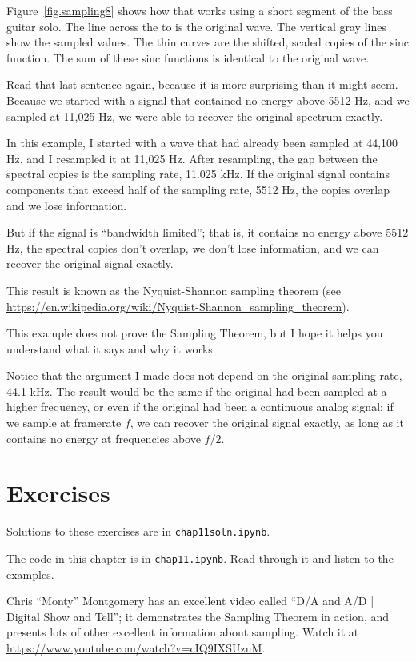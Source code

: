 \documentclass[12pt]{book}
\begin{document}
Figure~\ref{fig.sampling8} shows how that works using a short segment
of the bass guitar solo.  The line across the to is the original
wave.  The vertical gray lines show the sampled values.  The thin
curves are the shifted, scaled copies of the sinc function.
The sum of these sinc functions is identical to the original wave.

Read that last sentence again, because it is more surprising than it
might seem.  Because we started with a signal that contained no energy
above 5512 Hz, and we sampled at 11,025 Hz, we were able to recover
the original spectrum exactly.

In this example, I started with a wave that had already been
sampled at 44,100 Hz, and I resampled it at 11,025 Hz.  After
resampling, the gap between the spectral copies is the sampling
rate, 11.025 kHz.  If the original signal contains components that
exceed half of the sampling rate, 5512 Hz, the copies overlap
and we lose information.

But if the signal is ``bandwidth limited''; that is, it contains no
energy above 5512 Hz, the spectral copies don't overlap, we don't lose
information, and we can recover the original signal exactly.

This result is known as the Nyquist-Shannon sampling theorem (see 
\url{https://en.wikipedia.org/wiki/Nyquist-Shannon_sampling_theorem}).

This example does not prove the Sampling Theorem, but I hope it
helps you understand what it says and why it works.

Notice that the argument I made does
not depend on the original sampling rate, 44.1 kHz.  The result
would be the same if the original had been sampled at a higher
frequency, or even if the original had been a continuous analog
signal: if we sample at framerate $f$, we can recover the original
signal exactly, as long as it contains no energy at frequencies
above $f/2$.  


\section{Exercises}

Solutions to these exercises are in {\tt chap11soln.ipynb}.

\begin{exercise}
The code in this chapter is in {\tt chap11.ipynb}.  Read through
it and listen to the examples.
\end{exercise}


\begin{exercise}
Chris ``Monty'' Montgomery has an excellent video called ``D/A and A/D
| Digital Show and Tell''; it demonstrates the Sampling Theorem in
action, and presents lots of other excellent information about
sampling.  Watch it at
\url{https://www.youtube.com/watch?v=cIQ9IXSUzuM}.
\end{exercise}
\end{document}
